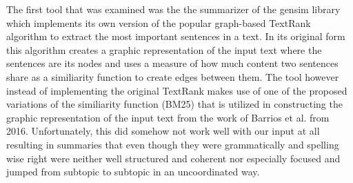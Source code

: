 The first tool that was examined was the the summarizer of the gensim library which implements its own version of the popular graph-based TextRank algorithm to extract the most important sentences in a text. In its original form this algorithm creates a graphic representation of the input text where the sentences are its nodes and uses a measure of how much content two sentences share as a similiarity function to create edges between them. The tool however instead of implementing the original TextRank makes use of one of the proposed variations of the similiarity function (BM25) that is utilized in constructing the graphic representation of the input text from the work of Barrios et al. from 2016. Unfortunately, this did somehow not work well with our input at all resulting in summaries that even though they were grammatically and spelling wise right were neither well structured and coherent nor especially focused and jumped from subtopic to subtopic in an uncoordinated way.  

